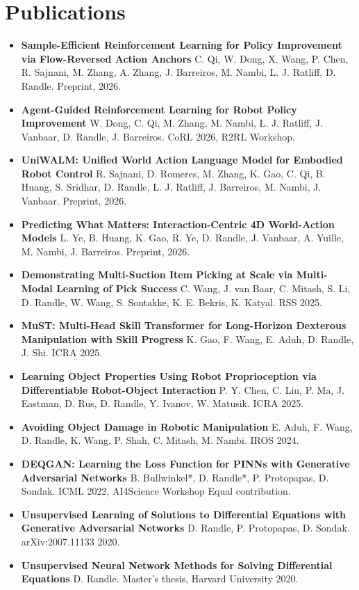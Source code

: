 \documentclass[a4paper,11pt]{article}
\newcommand{\resumeItem}[1]{
  \item\small{#1}
}
\newcommand{\resumeItemListStart}{
  \begin{itemize}[rightmargin=0.11in, itemsep=1.5pt, topsep=4pt, parsep=0pt, partopsep=0pt]
}
\newcommand{\resumeItemListEnd}{\end{itemize}}
\begin{document}
\section{Publications}
\resumeItemListStart
      \resumeItem{\textbf{Sample-Efficient Reinforcement Learning for Policy Improvement via Flow-Reversed Action Anchors} C. Qi, W. Dong, X. Wang, P. Chen, R. Sajnani, M. Zhang, A. Zhang, J. Barreiros, M. Nambi, L. J. Ratliff, D. Randle. Preprint, 2026.}
      \resumeItem{\textbf{Agent-Guided Reinforcement Learning for Robot Policy Improvement} W. Dong, C. Qi, M. Zhang, M. Nambi, L. J. Ratliff, J. Vanbaar, D. Randle, J. Barreiros. CoRL 2026, R2RL Workshop.}
      \resumeItem{\textbf{UniWALM: Unified World Action Language Model for Embodied Robot Control} R. Sajnani, D. Romeres, M. Zhang, K. Gao, C. Qi, B. Huang, S. Sridhar, D. Randle, L. J. Ratliff, J. Barreiros, M. Nambi, J. Vanbaar. Preprint, 2026.}
      \resumeItem{\textbf{Predicting What Matters: Interaction-Centric 4D World-Action Models} L. Ye, B. Huang, K. Gao, R. Ye, D. Randle, J. Vanbaar, A. Yuille, M. Nambi, J. Barreiros. Preprint, 2026.}
      \resumeItem{\textbf{Demonstrating Multi-Suction Item Picking at Scale via Multi-Modal Learning of Pick Success} C. Wang, J. van Baar, C. Mitash, S. Li, D. Randle, W. Wang, S. Sontakke, K. E. Bekris, K. Katyal. RSS 2025.}
      \resumeItem{\textbf{MuST: Multi-Head Skill Transformer for Long-Horizon Dexterous Manipulation with Skill Progress} K. Gao, F. Wang, E. Aduh, D. Randle, J. Shi. ICRA 2025.}
      \resumeItem{\textbf{Learning Object Properties Using Robot Proprioception via Differentiable Robot-Object Interaction} P. Y. Chen, C. Liu, P. Ma, J. Eastman, D. Rus, D. Randle, Y. Ivanov, W. Matusik. ICRA 2025.}
      \resumeItem{\textbf{Avoiding Object Damage in Robotic Manipulation} E. Aduh, F. Wang, D. Randle, K. Wang, P. Shah, C. Mitash, M. Nambi. IROS 2024.}
      \resumeItem{\textbf{DEQGAN: Learning the Loss Function for PINNs with Generative Adversarial Networks} B. Bullwinkel*, D. Randle*, P. Protopapas, D. Sondak. ICML 2022, AI4Science Workshop \textperiodcentered{} Equal contribution.}
      \resumeItem{\textbf{Unsupervised Learning of Solutions to Differential Equations with Generative Adversarial Networks} D. Randle, P. Protopapas, D. Sondak. arXiv:2007.11133 \textperiodcentered{} 2020.}
      \resumeItem{\textbf{Unsupervised Neural Network Methods for Solving Differential Equations} D. Randle. Master's thesis, Harvard University \textperiodcentered{} 2020.}
\resumeItemListEnd
\end{document}

